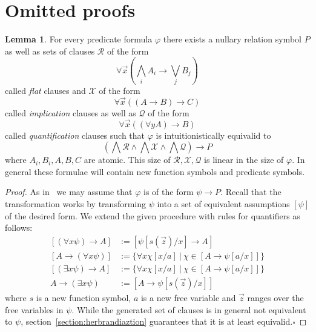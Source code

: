 \documentclass{easychair}
\theoremstyle{definition}
\theoremstyle{definition}
\theoremstyle{definition}
\newtheorem{lemma}[theorem]{Lemma}
\theoremstyle{definition}
\theoremstyle{definition}
\theoremstyle{definition}
\theoremstyle{definition}
\begin{document}



\appendix

\section{Omitted proofs}

\begin{lemma}\label{proof:first-order-normal-form}
	For every predicate formula $\varphi$ there exists a nullary relation symbol $P$ as well as sets of clauses $\mathcal R$ of the form
	$$\forall \vec x\left(\bigwedge_i A_i\to \bigvee_j B_j\right)$$
	called \emph{flat} clauses and $\mathcal X$ of the form
	$$\forall \vec x\left((A\to B)\to C\right)$$
	called \emph{implication} clauses as well as $\mathcal Q$ of the form
	$$\forall\vec x\left((\forall y A)\to B\right)$$
	called \emph{quantification} clauses such that $\varphi$ is intuitionistically equivalid to
	$$\left(\bigwedge\mathcal R\wedge\bigwedge \mathcal X\wedge\bigwedge\mathcal Q\right)\to P$$where $A_i, B_i, A, B, C$ are atomic. This size of $\mathcal R, \mathcal X, \mathcal Q$ is linear in the size of $\varphi$. In general these formulae will contain new function symbols and predicate symbols.
\end{lemma}

\begin{proof}
	As in~\cite{otten2005clausal} we may assume that $\varphi$ is of the form $\psi\to P$. Recall that the transformation works by transforming $\psi$ into a set of equivalent assumptions $\left\lbrack \psi\right\rbrack$ of the desired form. We extend the given procedure with rules for quantifiers as follows:
	\begin{align*}
		\left\lbrack(\forall x \psi)\to A\right\rbrack&:= \left\lbrack\psi[s(\vec z)/x]\to A\right\rbrack\\
		\left\lbrack A\to (\forall x\psi)\right\rbrack&:= \{\forall x\chi[x/a]\:|\:\chi\in\left\lbrack A\to\psi[a/x]\right\rbrack\}\\
		\left\lbrack(\exists x\psi)\to A\right\rbrack&:= \{\forall x\chi[x/a]\:|\:\chi\in\left\lbrack A\to\psi[a/x]\right\rbrack\}\\
		A\to (\exists x\psi)&:= \left\lbrack A\to\psi[s(\vec z)/x]\right\rbrack
	\end{align*}
	where $s$ is a new function symbol, $a$ is a new free variable and $\vec z$ ranges over the free variables in $\psi$.
	While the generated set of clauses is in general not equivalent to $\psi$, section~\ref{section:herbrandiaztion} guarantees that it is at least equivalid.\hfill$\square$
\end{proof}
\end{document}
